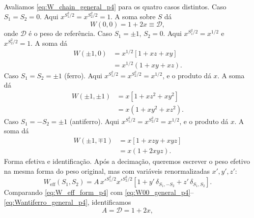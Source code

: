 \documentclass[12pt,a4paper]{article}
\begin{document}
%
Avaliamos \eqref{eq:W_chain_general_p4} para os quatro casos distintos. Caso \(S_1=S_2=0\). Aqui \(x^{S_1^2/2}=x^{S_2^2/2}=1\). A soma sobre \(S\) dá
%
\begin{equation}
    W(0,0)
    =
    1
    +
    2x
    \equiv
    \mathcal D,
    \label{eq:W00_general_p4}
\end{equation}
%
onde \(\mathcal D\) é o peso de referência. Caso \(S_1=\pm1\), \(S_2=0\). Aqui \(x^{S_1^2/2}=x^{1/2}\) e \(x^{S_2^2/2}=1\). A soma dá
%
\begin{align}
    W(\pm1,0)
    &=
    x^{1/2}
    \left[
        1
        +
        x z
        +
        x y
    \right]
    \nonumber\\[4pt]
    &=
    x^{1/2}
    \left(
        1
        +
        x y
        +
        x z
    \right).
    \label{eq:W10_general_p4}
\end{align}
%
Caso \(S_1=S_2=\pm1\) (ferro). Aqui \(x^{S_1^2/2}=x^{S_2^2/2}=x^{1/2}\), e o produto dá \(x\). A soma dá
%
\begin{align}
    W(\pm1,\pm1)
    &=
    x
    \left[
        1
        +
        x z^2
        +
        x y^2
    \right]
    \nonumber\\[4pt]
    &=
    x
    \left(
        1
        +
        x y^2
        +
        x z^2
    \right).
    \label{eq:Wferro_general_p4}
\end{align}
%
Caso \(S_1=-S_2=\pm1\) (antiferro). Aqui \(x^{S_1^2/2}=x^{S_2^2/2}=x^{1/2}\), e o produto dá \(x\). A soma dá
%
\begin{align}
    W(\pm1,\mp1)
    &=
    x
    \left[
        1
        +
        x z y
        +
        x y z
    \right]
    \nonumber\\[4pt]
    &=
    x
    \left(
        1
        +
        2 x y z
    \right).
    \label{eq:Wantiferro_general_p4}
\end{align}
%
Forma efetiva e identificação. Após a decimação, queremos escrever o peso efetivo na mesma forma do peso original, mas com variáveis renormalizadas \(x',y',z'\):
%
\begin{equation}
    W_{\mathrm{eff}}(S_1,S_2)
    =
    A\,
    x'^{S_1^2/2}
    x'^{S_2^2/2}
    \left[
        1
        +
        y'\,\delta_{S_1,-S_2}
        +
        z'\,\delta_{S_1,S_2}
    \right].
    \label{eq:W_eff_form_p4}
\end{equation}
%
Comparando \eqref{eq:W_eff_form_p4} com
\eqref{eq:W00_general_p4}--\eqref{eq:Wantiferro_general_p4}, identificamos
%
\begin{equation}
    A
    =
    \mathcal D
    =
    1
    +
    2x,
    \label{eq:A_p4}
\end{equation}
\end{document}
